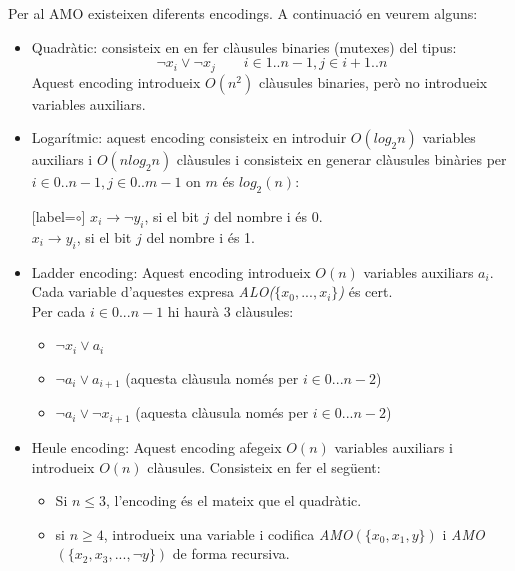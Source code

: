 \documentclass[11pt,a4paper,twoside]{report}
\begin{document}
  Per al AMO existeixen diferents encodings. A continuació en veurem alguns:
  \begin{itemize}
    \item Quadràtic: consisteix en en fer clàusules binaries (mutexes) del tipus: \[ \neg x_i \vee \neg x_j \qquad i \in 1..n-1, j \in i+1..n\] Aquest encoding introdueix $O(n^2)$ clàusules binaries, però no introdueix variables auxiliars.
    \item Logarítmic: aquest encoding consisteix en introduir $O(log_2 n)$ variables auxiliars i $O(n log_2 n)$ clàusules i consisteix en generar clàusules binàries per $i \in 0..n-1, j \in 0..m-1$ on $m$ és $log_2(n)$:\\
          \begin{center}[label=$\circ$]
            $x_i \rightarrow \neg y_i$, si el bit $j$ del nombre i és 0. \\
            $x_i \rightarrow y_i$, si el bit $j$ del nombre i és 1.
          \end{center}
    \item Ladder encoding: Aquest encoding introdueix $O(n)$ variables auxiliars $a_i$. Cada variable d'aquestes expresa \textit{ALO($\{x_0, ... , x_i\}$)} és cert. \\
          Per cada $i \in 0...n-1$ hi haurà 3 clàusules:
          \begin{itemize}[label=$\circ$]
            \item $\neg x_i \vee a_i$
            \item $\neg a_i \vee a_{i+1}$  (aquesta clàusula només per $i \in 0...n-2$)
            \item $\neg a_i \vee \neg x_{i+1}$ (aquesta clàusula només per  $i \in 0...n-2$)
          \end{itemize}
    
    \item Heule encoding: Aquest encoding afegeix $O(n)$ variables auxiliars i introdueix $O(n)$ clàusules. Consisteix en fer el següent:\\ 
    \begin{itemize}
      \item Si $n \leq 3$, l'encoding és el mateix que el quadràtic.
      \item si $n \geq 4$, introdueix una variable i codifica \textit{AMO$(\{x_0, x_1, y\})$} i \textit{AMO$(\{x_2, x_3, ...  ,\neg y\})$} de forma recursiva.
    \end{itemize} 
          
    
  \end{itemize}
\end{document}
